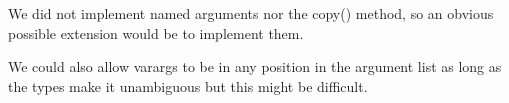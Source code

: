 We did not implement named arguments nor the copy() method, so an obvious possible extension would be to implement them.

We could also allow varargs to be in any position in the argument list as long as the types make it unambiguous but this might be difficult.